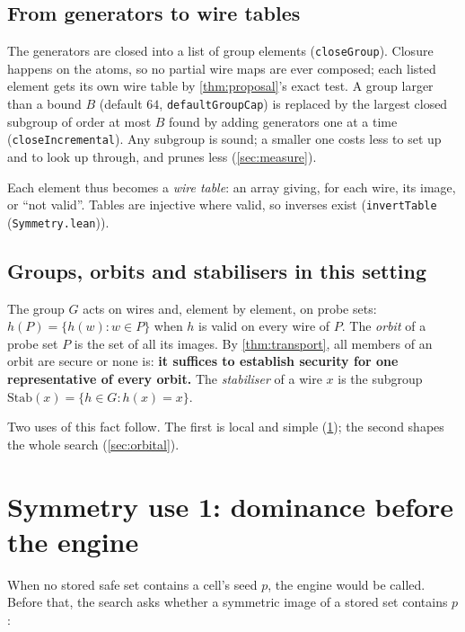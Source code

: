 \documentclass[11pt,a4paper]{article}
\theoremstyle{definition}
\theoremstyle{remark}
\newcommand{\code}[1]{\texttt{\small #1}}
\newcommand{\lean}[2]{\code{#1}\,(\code{#2})}
\newcommand{\Stab}{\mathrm{Stab}}
\begin{document}
\subsection{From generators to wire tables}

The generators are closed into a list of group elements (\code{closeGroup}).  Closure happens on
the atoms, so no partial wire maps are ever composed; each listed element gets its own wire table
by \cref{thm:proposal}'s exact test.  A group larger than a bound $B$ (default $64$,
\code{defaultGroupCap}) is replaced by the largest closed subgroup of order at most $B$ found by
adding generators one at a time (\code{closeIncremental}).  Any subgroup is sound; a smaller one
costs less to set up and to look up through, and prunes less (\cref{sec:measure}).

Each element thus becomes a \emph{wire table}: an array giving, for each wire, its image, or
``not valid''.  Tables are injective where valid, so inverses exist
(\lean{invertTable}{Symmetry.lean}).

\subsection{Groups, orbits and stabilisers in this setting}

The group $G$ acts on wires and, element by element, on probe sets:
$h(P) = \{h(w) : w\in P\}$ when $h$ is valid on every wire of $P$.  The \emph{orbit} of a
probe set $P$ is the set of all its images.  By \cref{thm:transport}, all members of an orbit
are secure or none is: \textbf{it suffices to establish security for one representative of
every orbit.}  The \emph{stabiliser} of a wire $x$ is the subgroup $\Stab(x) = \{h\in G :
h(x)=x\}$.

Two uses of this fact follow.  The first is local and simple (\cref{sec:dominance}); the
second shapes the whole search (\cref{sec:orbital}).

\section{Symmetry use 1: dominance before the engine}\label{sec:dominance}

When no stored safe set contains a cell's seed $p$, the engine would be called.  Before
that, the search asks whether a symmetric image of a stored set contains $p$:
\end{document}

